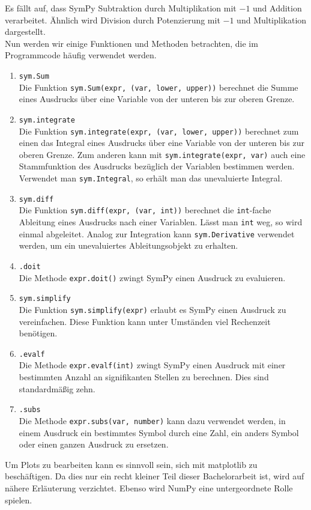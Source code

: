 Es fällt auf, dass SymPy Subtraktion durch Multiplikation mit $-1$ und Addition verarbeitet. Ähnlich wird Division durch Potenzierung mit $-1$ und Multiplikation dargestellt.\\

Nun werden wir einige Funktionen und Methoden betrachten, die im Programmcode häufig verwendet werden.

\begin{enumerate}[label=(\roman*)]
\item \lstinline|sym.Sum|\\
Die Funktion \lstinline|sym.Sum(expr, (var, lower, upper))| berechnet die Summe eines Ausdrucks über eine Variable von der unteren bis zur oberen Grenze.

\item \lstinline|sym.integrate|\\
Die Funktion \lstinline|sym.integrate(expr, (var, lower, upper))| berechnet zum einen das Integral eines Ausdrucks über eine Variable von der unteren bis zur oberen Grenze. Zum anderen kann mit \lstinline|sym.integrate(expr, var)| auch eine Stammfunktion des Ausdrucks bezüglich der Variablen bestimmen werden. Verwendet man \lstinline|sym.Integral|, so erhält man das unevaluierte Integral.

\item \lstinline|sym.diff|\\
Die Funktion \lstinline|sym.diff(expr, (var, int))| berechnet die \lstinline|int|-fache Ableitung eines Ausdrucks nach einer Variablen. Lässt man \lstinline|int| weg, so wird einmal abgeleitet. Analog zur Integration kann \lstinline|sym.Derivative| verwendet werden, um ein unevaluiertes Ableitungsobjekt zu erhalten.

\item \lstinline|.doit|\\
Die Methode \lstinline|expr.doit()| zwingt SymPy einen Ausdruck zu evaluieren.

\item \lstinline|sym.simplify|\\
Die Funktion \lstinline|sym.simplify(expr)| erlaubt es SymPy einen Ausdruck zu vereinfachen. Diese Funktion kann unter Umständen viel Rechenzeit benötigen.

\item \lstinline|.evalf|\\
Die Methode \lstinline|expr.evalf(int)| zwingt SymPy einen Ausdruck mit einer bestimmten Anzahl an signifikanten Stellen zu berechnen. Dies sind standardmäßig zehn.

\item \lstinline|.subs|\\
Die Methode \lstinline|expr.subs(var, number)| kann dazu verwendet werden, in einem Ausdruck ein bestimmtes Symbol durch eine Zahl, ein anders Symbol oder einen ganzen Ausdruck zu ersetzen.
\end{enumerate}

Um Plots zu bearbeiten kann es sinnvoll sein, sich mit matplotlib zu beschäftigen. Da dies nur ein recht kleiner Teil dieser Bachelorarbeit ist, wird auf nähere Erläuterung verzichtet. Ebenso wird NumPy eine untergeordnete Rolle spielen.
